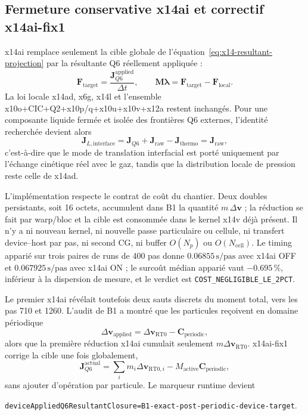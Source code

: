 \documentclass[11pt,a4paper]{article}
\begin{document}
\subsection{Fermeture conservative x14ai et correctif x14ai-fix1}

x14ai remplace seulement la cible globale de l'équation~\eqref{eq:x14-resultant-projection} par la résultante Q6 réellement appliquée :
\begin{equation}
  \bm F_{\mathrm{target}}
  =\frac{\bm J_{Q6}^{\mathrm{applied}}}{\Delta t},
  \qquad
  \bm M\bm\lambda
  =\bm F_{\mathrm{target}}-\bm F_{\mathrm{local}}.
  \label{eq:x14ai-target}
\end{equation}
La loi locale x14ad, x6g, x14l et l'ensemble x10o+CIC+Q2+x10p/q+x10u+x10v+x12a restent inchangés. Pour une composante liquide fermée et isolée des frontières Q6 externes, l'identité recherchée devient alors
\begin{equation}
  \bm J_{L,\mathrm{interface}}
  =\bm J_{Q6}+\bm J_{\mathrm{raw}}-\bm J_{\mathrm{thermo}}
  =\bm J_{\mathrm{raw}},
\end{equation}
c'est-à-dire que le mode de translation interfacial est porté uniquement par l'échange cinétique réel avec le gaz, tandis que la distribution locale de pression reste celle de x14ad.

L'implémentation respecte le contrat de coût du chantier. Deux doubles persistants, soit 16 octets, accumulent dans B1 la quantité $m\,\Delta\bm v$ ; la réduction se fait par warp/bloc et la cible est consommée dans le kernel x14v déjà présent. Il n'y a ni nouveau kernel, ni nouvelle passe particulaire ou cellule, ni transfert device--host par pas, ni second CG, ni buffer $O(N_p)$ ou $O(N_{\mathrm{cell}})$. Le timing apparié sur trois paires de runs de 400 pas donne $0.06855\,\mathrm{s/pas}$ avec x14ai OFF et $0.067925\,\mathrm{s/pas}$ avec x14ai ON ; le surcoût médian apparié vaut $-0.695\,\%$, inférieur à la dispersion de mesure, et le verdict est \texttt{COST\_NEGLIGIBLE\_LE\_2PCT}.

Le premier x14ai révélait toutefois deux sauts discrets du moment total, vers les pas 710 et 1260. L'audit de B1 a montré que les particules reçoivent en domaine périodique
\begin{equation}
  \Delta\bm v_{\mathrm{applied}}
  =\Delta\bm v_{\mathrm{RT0}}-\bm C_{\mathrm{periodic}},
\end{equation}
alors que la première réduction x14ai cumulait seulement $m\Delta\bm v_{\mathrm{RT0}}$. x14ai-fix1 corrige la cible une fois globalement,
\begin{equation}
  \bm J_{Q6}^{\mathrm{actual}}
  =\sum_i m_i\Delta\bm v_{\mathrm{RT0},i}
   -M_{\mathrm{active}}\bm C_{\mathrm{periodic}},
  \label{eq:x14ai-fix1}
\end{equation}
sans ajouter d'opération par particule. Le marqueur runtime devient\begin{center}\small\nolinkurl{deviceAppliedQ6ResultantClosure=B1-exact-post-periodic-device-target}.\end{center}
\end{document}
